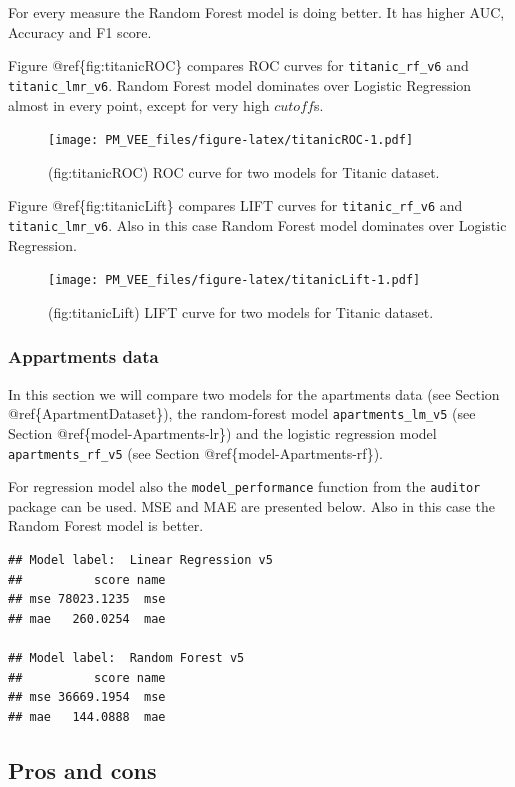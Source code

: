 \documentclass[12pt,]{krantz}
\begin{document}
For every measure the Random Forest model is doing better. It has higher AUC, Accuracy and F1 score.

Figure @ref\{fig:titanicROC\} compares ROC curves for \texttt{titanic\_rf\_v6} and \texttt{titanic\_lmr\_v6}. Random Forest model dominates over Logistic Regression almost in every point, except for very high \(cutoff\)s.

\begin{figure}
\centering
\texttt{[image: PM\_VEE\_files/figure-latex/titanicROC-1.pdf]}
\caption{\label{fig:titanicROC}(fig:titanicROC) ROC curve for two models for Titanic dataset.}
\end{figure}

Figure @ref\{fig:titanicLift\} compares LIFT curves for \texttt{titanic\_rf\_v6} and \texttt{titanic\_lmr\_v6}. Also in this case Random Forest model dominates over Logistic Regression.

\begin{figure}
\centering
\texttt{[image: PM\_VEE\_files/figure-latex/titanicLift-1.pdf]}
\caption{\label{fig:titanicLift}(fig:titanicLift) LIFT curve for two models for Titanic dataset.}
\end{figure}

\hypertarget{modelPerformanceApartments}{%
\subsubsection{Appartments data}\label{modelPerformanceApartments}}

In this section we will compare two models for the apartments data (see Section @ref\{ApartmentDataset\}), the random-forest model \texttt{apartments\_lm\_v5} (see Section @ref\{model-Apartments-lr\}) and the logistic regression model \texttt{apartments\_rf\_v5} (see Section @ref\{model-Apartments-rf\}).

For regression model also the \texttt{model\_performance} function from the \texttt{auditor} package can be used. MSE and MAE are presented below. Also in this case the Random Forest model is better.

\begin{verbatim}
## Model label:  Linear Regression v5 
##          score name
## mse 78023.1235  mse
## mae   260.0254  mae

## Model label:  Random Forest v5 
##          score name
## mse 36669.1954  mse
## mae   144.0888  mae
\end{verbatim}

\hypertarget{modelPerformanceProsCons}{%
\subsection{Pros and cons}\label{modelPerformanceProsCons}}
\end{document}
